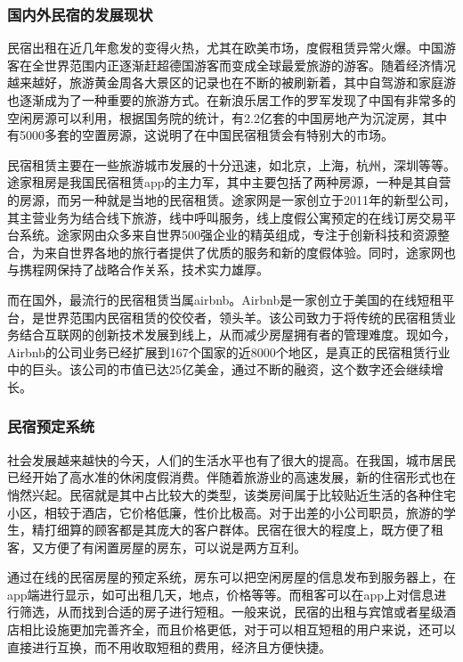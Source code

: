 \documentclass[lang=cn,11pt,a4paper,cite=authoryear]{elegantpaper}
\begin{document}
\subsubsection{国内外民宿的发展现状}

民宿出租在近几年愈发的变得火热，尤其在欧美市场，度假租赁异常火爆。中国游客在全世界范围内正逐渐赶超德国游客而变成全球最爱旅游的游客。随着经济情况越来越好，旅游黄金周各大景区的记录也在不断的被刷新着，其中自驾游和家庭游也逐渐成为了一种重要的旅游方式。在新浪乐居工作的罗军发现了中国有非常多的空闲房源可以利用，根据国务院的统计，有2.2亿套的中国房地产为沉淀房，其中有5000多套的空置房源，这说明了在中国民宿租赁会有特别大的市场。

民宿租赁主要在一些旅游城市发展的十分迅速，如北京，上海，杭州，深圳等等。途家租房是我国民宿租赁app的主力军，其中主要包括了两种房源，一种是其自营的房源，而另一种就是当地的民宿租赁。途家网是一家创立于2011年的新型公司，其主营业务为结合线下旅游，线中呼叫服务，线上度假公寓预定的在线订房交易平台系统。途家网由众多来自世界500强企业的精英组成，专注于创新科技和资源整合，为来自世界各地的旅行者提供了优质的服务和新的度假体验。同时，途家网也与携程网保持了战略合作关系，技术实力雄厚。

而在国外，最流行的民宿租赁当属airbnb。Airbnb是一家创立于美国的在线短租平台，是世界范围内民宿租赁的佼佼者，领头羊。该公司致力于将传统的民宿租赁业务结合互联网的创新技术发展到线上，从而减少房屋拥有者的管理难度。现如今，Airbnb的公司业务已经扩展到167个国家的近8000个地区，是真正的民宿租赁行业中的巨头。该公司的市值已达25亿美金，通过不断的融资，这个数字还会继续增长。

\subsubsection{民宿预定系统}

社会发展越来越快的今天，人们的生活水平也有了很大的提高。在我国，城市居民已经开始了高水准的休闲度假消费。伴随着旅游业的高速发展，新的住宿形式也在悄然兴起。民宿就是其中占比较大的类型，该类房间属于比较贴近生活的各种住宅小区，相较于酒店，它价格低廉，性价比极高。对于出差的小公司职员，旅游的学生，精打细算的顾客都是其庞大的客户群体。民宿在很大的程度上，既方便了租客，又方便了有闲置房屋的房东，可以说是两方互利。

通过在线的民宿房屋的预定系统，房东可以把空闲房屋的信息发布到服务器上，在app端进行显示，如可出租几天，地点，价格等等。而租客可以在app上对信息进行筛选，从而找到合适的房子进行短租。一般来说，民宿的出租与宾馆或者星级酒店相比设施更加完善齐全，而且价格更低，对于可以相互短租的用户来说，还可以直接进行互换，而不用收取短租的费用，经济且方便快捷。
\end{document}
